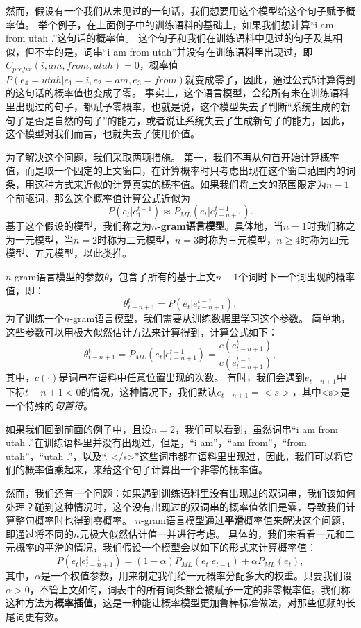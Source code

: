 \documentclass[10pt,a4paper]{ctexart}
\begin{document}
然而，假设有一个我们从未见过的一句话，我们想要用这个模型给这个句子赋予概率值。
举个例子，在上面例子中的训练语料的基础上，如果我们想计算“i am from utah .”这句话的概率值。
这个句子和我们在训练语料中见过的句子及其相似，但不幸的是，词串“i am from utah”并没有在训练语料里出现过，即$C_{prefix}(i,am,from,utah)=0$，概率值$P(e_4=utah|e_1=i,e_2=am,e_3=from)$就变成零了，因此，通过公式5计算得到的这句话的概率值也变成了零。
事实上，这个语言模型，会给所有未在训练语料里出现过的句子，都赋予零概率，也就是说，这个模型失去了判断“系统生成的新句子是否是自然的句子”的能力，或者说让系统失去了生成新句子的能力，因此，这个模型对我们而言，也就失去了使用价值。

为了解决这个问题，我们采取两项措施。
第一，我们不再从句首开始计算概率值，而是取一个固定的上文窗口，在计算概率时只考虑出现在这个窗口范围内的词条，用这种方式来近似的计算真实的概率值。如果我们将上文的范围限定为$n-1$个前驱词，那么这个概率值计算公式近似为
\[
  P(e_t|e_1^{t-1}) \approx P_{ML}(e_t|e_{t-n+1}^{t-1}).
\]
基于这个假设的模型，我们称之为\textbf{$n$-gram语言模型}。具体地，当$n=1$时我们称之为一元模型，当$n=2$时称为二元模型，$n=3$时称为三元模型，$n \geq 4$时称为四元模型、五元模型，以此类推。

$n$-gram语言模型的参数$\theta$，包含了所有的基于上文$n-1$个词时下一个词出现的概率值，即：
\[
  \theta_{t-n+1}^{t} = P(e_t | e_{t-n+1}^{t-1}),
\]
为了训练一个$n$-gram语言模型，我们需要从训练数据里学习这个参数。
简单地，这些参数可以用极大似然估计方法来计算得到，计算公式如下：
\[
  \theta_{t-n+1}^{t} = P_{ML}(e_t | e_{t-n+1}^{t-1}) = \frac{c(e_{t-n+1}^{t})}{c(e_{t-n+1}^{t-1})},
\]
其中，$c(\cdot)$是词串在语料中任意位置出现的次数。
有时，我们会遇到$e_{t-n+1}$中下标$t-n+1<0$的情况，这种情况下，我们默认$e_{t-n+1}=<s>$，其中<s>是一个特殊的\textit{句首符}。

如果我们回到前面的例子中，且设$n=2$，我们可以看到，虽然词串“i am from utah .”在训练语料里并没有出现过，但是，“i am”，“am from”，“from utah”，“utah .”，以及“. </s>”这些词串都在语料里出现过，因此，我们可以将它们的概率值乘起来，来给这个句子计算出一个非零的概率值。

然而，我们还有一个问题：如果遇到训练语料里没有出现过的双词串，我们该如何处理？碰到这种情况时，这个没有出现过的双词串的概率值依旧是零，导致我们计算整句概率时也得到零概率。
$n$-gram语言模型通过\textbf{平滑}概率值来解决这个问题，即通过将不同的$n$元极大似然估计值一并进行考虑。
具体的，我们来看看一元和二元概率的平滑的情况，我们假设一个模型会以如下的形式来计算概率值：
\[
 P(e_t|e_{t-n+1}^{t-1}) = (1 - \alpha)P_{ML}(e_t|e_{t-1}) + \alpha P_{ML}(e_t),
\]
其中，$\alpha$是一个权值参数，用来制定我们给一元概率分配多大的权重。只要我们设$\alpha > 0$，不管上文如何，词表中的所有词条都会被赋予一定的非零概率值。我们称这种方法为\textbf{概率插值}，这是一种能让概率模型更加鲁棒标准做法，对那些低频的长尾词更有效。
\end{document}
